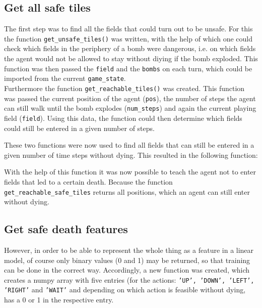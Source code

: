 \subsection{Get all safe tiles}
The first step was to find all the fields that could turn out to be unsafe. For this the function \texttt{get\_unsafe\_tiles()} was written, with the help of which one could check which fields in the periphery of a bomb were dangerous, i.e. on which fields the agent would not be allowed to stay without diying if the bomb exploded. This function was then passed the \texttt{field} and the \texttt{bombs} on each turn, which could be imported from the current \texttt{game\_state}.
\\

Furthermore the function \texttt{get\_reachable\_tiles()} was created. This function was passed the current position of the agent (\texttt{pos}), the number of steps the agent can still walk until the bomb explodes (\texttt{num\_steps}) and again the current playing field (\texttt{field}). Using this data, the function could then determine which fields could still be entered in a given number of steps. \vspace{0.2cm}

These two functions were now used to find all fields that can still be entered in a given number of time steps without dying. This resulted in the following function:
\vspace{0.1cm}

\vspace{0.1cm}
With the help of this function it was now possible to teach the agent not to enter fields that led to a certain death. Because the function \texttt{get\_reachable\_safe\_tiles} returns all positions, which an agent can still enter without dying.


\subsection{Get safe death features}
However, in order to be able to represent the whole thing as a feature in a linear model, of course only binary values (0 and 1) may be returned, so that training can be done in the correct way. Accordingly, a new function was created, which creates a numpy array with five entries (for the actions: \texttt{'UP', 'DOWN', 'LEFT', 'RIGHT'} and \texttt{'WAIT'} and depending on which action is feasible without dying, has a 0 or 1 in the respective entry.  
\\

